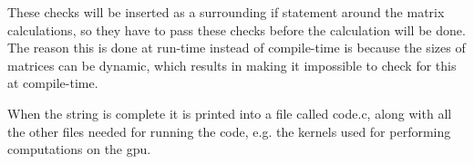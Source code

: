 These checks will be inserted as a surrounding if statement around the matrix calculations, so they have to pass these checks before the calculation will be done.
The reason this is done at run-time instead of compile-time is because the sizes of matrices can be dynamic, which results in making it impossible to check for this at compile-time.

When the string is complete it is printed into a file called code.c, along with all the other files needed for running the code, e.g. the kernels used for performing computations on the \acrshort{gpu}.

